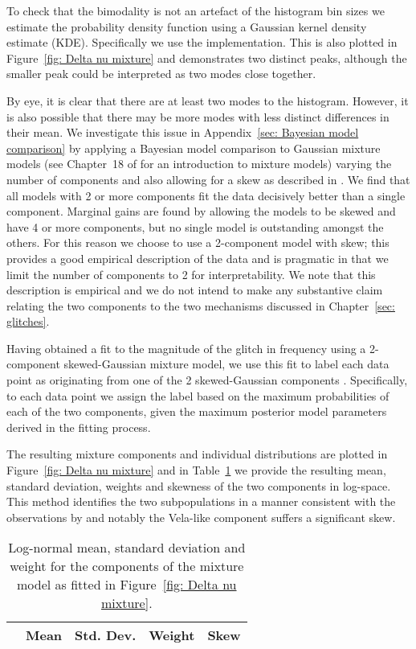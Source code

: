 \documentclass[../full_thesis/full_thesis.tex]{subfiles}
\newcommand{\thisdir}{../glitches_in_CGW}
\begin{document}
To check that the bimodality is not an artefact of the histogram bin sizes we
estimate the probability density function using a Gaussian kernel density
estimate (KDE). Specifically we use the \citet*{Scipy} implementation. This is
also plotted in Figure~\ref{fig: Delta nu mixture} and demonstrates two distinct
peaks, although the smaller peak could be interpreted as two modes close together.

By eye, it is clear that there are at least two modes to the histogram. However,
it is also possible that there may be more modes with less distinct differences
in their mean. We investigate this issue in Appendix~\ref{sec: Bayesian model
comparison} by applying a Bayesian model comparison to Gaussian
mixture models (see
Chapter~18 of \citet{gelman2013bayesian} for an introduction to mixture models) varying the number of components and also allowing for a skew as
described in \citet{Ohagan1976}.  We find that all models with 2 or more
components fit the data decisively better than a single component. Marginal
gains are found by allowing the models to be skewed and have 4 or more
components, but no single model is outstanding amongst the others. For this
reason we choose to use a 2-component model with skew; this provides a good
empirical description of the data and is pragmatic in that we limit the number
of components to 2 for interpretability. We note that this description is
empirical and we do not intend to make any substantive claim relating the two
components to the two mechanisms discussed in Chapter~\ref{sec: glitches}.

Having obtained a fit to the magnitude of the glitch in frequency using a
2-component skewed-Gaussian mixture model, we use this fit to label each data
point as originating from one of the 2 skewed-Gaussian components . Specifically, to
each data point we assign the label based on the maximum probabilities of each
of the two components, given the maximum posterior model parameters derived in
the fitting process.

The resulting mixture components and individual
distributions are plotted in Figure~\ref{fig: Delta nu mixture} and in
Table~\ref{tab: mixture components} we provide the resulting mean, standard
deviation, weights and skewness of the two components in log-space.
This method identifies the two subpopulations in a manner consistent with the
observations by \citet{Espinoza2011} and notably the Vela-like component suffers
a significant skew.

\begin{table}[htb]
\begin{tabular}{lcccc}
& Mean &Std. Dev. & Weight & Skew \\ \hline

\end{tabular}
\caption{Log-normal mean, standard deviation and weight for the components of
the mixture model as fitted in Figure~\ref{fig: Delta nu mixture}.}
\label{tab: mixture components}
\end{table}
\end{document}
